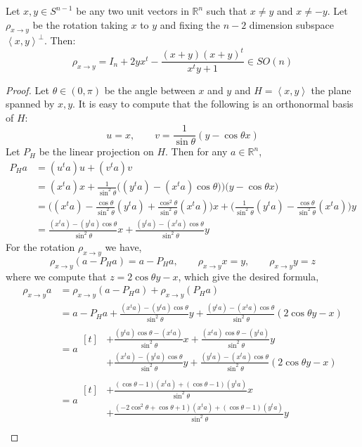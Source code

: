 \begin{computation}\label{com:rotation} Let $x,y\in S^{n-1}$ be any two unit vectors in $\mathbb{R}^n$ such that $x\neq y$ and $x\neq -y$. Let $\rho_{x\to y}$ be the rotation taking $x$ to $y$ and fixing the $n-2$ dimension subspace $\left<x,y\right>^{\perp}$. Then:
\[\rho_{x\to y}=I_n+2yx^t-\frac{(x+y)(x+y)^t}{x^ty+1}\in SO(n)\]
\end{computation}
\begin{proof} Let $\theta\in(0,\pi)$ be the angle between $x$ and $y$ and $H=\left<x,y\right>$ the plane spanned by $x,y$. It is easy to compute that the following is an orthonormal basis of $H$:
\[u=x,\qquad v=\frac{1}{\sin\theta}(y-\cos\theta x)\]
Let $P_H$ be the linear projection on $H$. Then for any $a\in\mathbb{R}^n$,
\begin{align*}
P_Ha&=(u^ta)u+(v^ta)v\\
&=(x^ta)x+\frac{1}{\sin^2\theta}\big((y^ta)-(x^ta)\cos\theta)\big)\big(y-\cos\theta x\big)\\
&=\Big((x^ta)-\frac{\cos\theta}{\sin^2\theta}(y^ta)+\frac{\cos^2\theta}{\sin^2\theta}(x^ta)\Big)x+\Big(\frac{1}{\sin^2\theta}(y^ta)-\frac{\cos\theta}{\sin^2\theta}(x^ta)\Big)y\\
&=\frac{(x^ta)-(y^ta)\cos\theta}{\sin^2\theta}x+\frac{(y^ta)-(x^ta)\cos\theta}{\sin^2\theta}y
\end{align*}
For the rotation $\rho_{x\to y}$ we have,
\[\rho_{x\to y}(a-P_Ha)=a-P_Ha,\qquad\rho_{x\to y}x=y,\qquad\rho_{x\to y}y=z\]
where we compute that $z=2\cos\theta y-x$, which give the desired formula,
\begingroup
\allowdisplaybreaks
\begin{align*}
\rho_{x\to y}a&=\rho_{x\to y}(a-P_Ha)+\rho_{x\to y}(P_Ha)\\
&=a-P_Ha+\frac{(x^ta)-(y^ta)\cos\theta}{\sin^2\theta}y+\frac{(y^ta)-(x^ta)\cos\theta}{\sin^2\theta}(2\cos\theta y-x)\\
&=a\begin{aligned}[t]&+\frac{(y^ta)\cos\theta-(x^ta)}{\sin^2\theta}x+\frac{(x^ta)\cos\theta-(y^ta)}{\sin^2\theta}y\\
&+\frac{(x^ta)-(y^ta)\cos\theta}{\sin^2\theta}y+\frac{(y^ta)-(x^ta)\cos\theta}{\sin^2\theta}(2\cos\theta y-x)\end{aligned}\\
&=a\begin{aligned}[t]&+\frac{(\cos\theta-1)(x^ta)+(\cos\theta-1)(y^ta)}{\sin^2\theta}x\\
&+\frac{(-2\cos^2\theta+\cos\theta+1)(x^ta)+(\cos\theta-1)(y^ta)}{\sin^2\theta}y\end{aligned}\\

\end{align*}
\end{proof}
